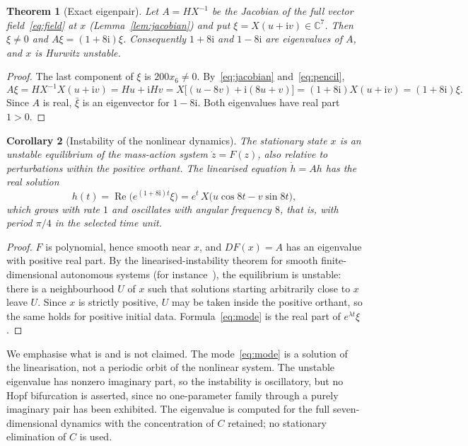 \documentclass[11pt,a4paper]{article}
\theoremstyle{plain}
\newtheorem{theorem}{Theorem}[section]
\newtheorem{corollary}[theorem]{Corollary}
\theoremstyle{definition}
\theoremstyle{remark}
\numberwithin{equation}{section}
\newcommand{\C}{\mathbb{C}}
\renewcommand{\Re}{\operatorname{Re}}
\newcommand{\iu}{\mathrm{i}}
\begin{document}
\begin{theorem}[Exact eigenpair]\label{thm:eigenpair}
Let $A=HX^{-1}$ be the Jacobian of the full vector field~\eqref{eq:field} at $x$ (Lemma~\ref{lem:jacobian}) and put $\xi=X(u+\iu v)\in\C^7$. Then $\xi\ne0$ and $A\xi=(1+8\iu)\xi$. Consequently $1+8\iu$ and $1-8\iu$ are eigenvalues of $A$, and $x$ is Hurwitz unstable.
\end{theorem}

\begin{proof}
The last component of $\xi$ is $200x_6\ne0$. By~\eqref{eq:jacobian} and~\eqref{eq:pencil},
\[
A\xi=HX^{-1}X(u+\iu v)=Hu+\iu Hv=X\bigl[(u-8v)+\iu(8u+v)\bigr]=(1+8\iu)X(u+\iu v)=(1+8\iu)\xi .
\]
Since $A$ is real, $\bar\xi$ is an eigenvector for $1-8\iu$. Both eigenvalues have real part $1>0$.
\end{proof}

\begin{corollary}[Instability of the nonlinear dynamics]\label{cor:instability}
The stationary state $x$ is an unstable equilibrium of the mass-action system $\dot z=F(z)$, also relative to perturbations within the positive orthant. The linearised equation $\dot h=Ah$ has the real solution
\begin{equation}\label{eq:mode}
h(t)=\Re\bigl(e^{(1+8\iu)t}\xi\bigr)=e^{t}\,X\bigl(u\cos 8t-v\sin 8t\bigr),
\end{equation}
which grows with rate $1$ and oscillates with angular frequency $8$, that is, with period $\pi/4$ in the selected time unit.
\end{corollary}

\begin{proof}
$F$ is polynomial, hence smooth near $x$, and $DF(x)=A$ has an eigenvalue with positive real part. By the linearised-instability theorem for smooth finite-dimensional autonomous systems (for instance~\cite[Chapter~2]{Perko2001}), the equilibrium is unstable: there is a neighbourhood $U$ of $x$ such that solutions starting arbitrarily close to $x$ leave $U$. Since $x$ is strictly positive, $U$ may be taken inside the positive orthant, so the same holds for positive initial data. Formula~\eqref{eq:mode} is the real part of $e^{\lambda t}\xi$.
\end{proof}

We emphasise what is and is not claimed. The mode~\eqref{eq:mode} is a solution of the linearisation, not a periodic orbit of the nonlinear system. The unstable eigenvalue has nonzero imaginary part, so the instability is oscillatory, but no Hopf bifurcation is asserted, since no one-parameter family through a purely imaginary pair has been exhibited. The eigenvalue is computed for the full seven-dimensional dynamics with the concentration of $C$ retained; no stationary elimination of $C$ is used.
\end{document}
